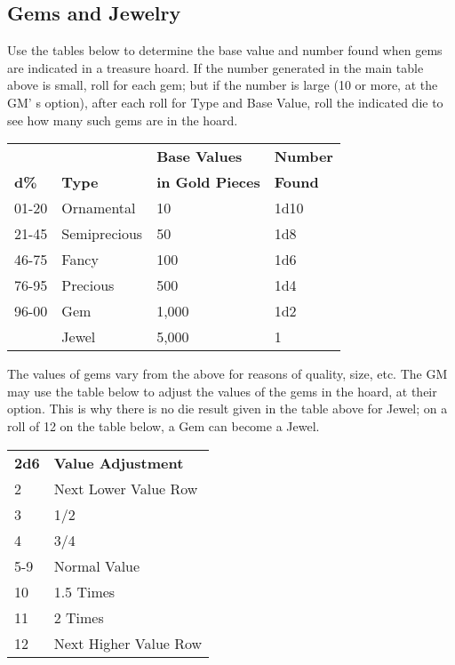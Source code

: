 \documentclass[a4paper,twoside,openany,10pt]{book}
\begin{document}
\begin{multicols}{2}
	
\subsection{Gems and Jewelry}\label{gems-and-jewelry}

Use the tables below to determine the base value and number found when gems are indicated in a treasure hoard. If the number generated in the main table above is small, roll for each gem; but if the number is large (10 or more, at the GM' s option), after each roll for Type and Base Value, roll the indicated die to see how many such gems are in the hoard.\medskip

\begin{tabular*}{0.93\linewidth}{@{\extracolsep{\fill}}llll}
&  & \textbf{Base Values} & \textbf{Number}\\
\textbf{d\%} & \textbf{Type} & \textbf{in Gold Pieces} & \textbf{Found}\\\toprule
01-20 & Ornamental & 10 & 1d10 \\\hline
21-45 & Semiprecious & 50 & 1d8 \\\hline
46-75 & Fancy & 100 & 1d6 \\\hline
76-95 & Precious & 500 & 1d4 \\\hline
96-00 & Gem & 1,000 & 1d2 \\\hline
& Jewel & 5,000 & 1 \\\bottomrule
\end{tabular*}\medskip

The values of gems vary from the above for reasons of quality, size, etc. The GM may use the table below to adjust the values of the gems in the hoard, at their option. This is why there is no die result given in the table above for Jewel; on a roll of 12 on the table below, a Gem can become a Jewel.\medskip

\begin{tabular*}{0.93\linewidth}{@{\extracolsep{\fill}}ll}
\textbf{2d6} & \textbf{Value Adjustment} \\
2 & Next Lower Value Row \\\toprule
3 & 1/2 \\\hline
4 & 3/4 \\\hline
5-9 & Normal Value \\\hline
10 & 1.5 Times \\\hline
11 & 2 Times \\\hline
12 & Next Higher Value Row \\\bottomrule
\end{tabular*}\medskip


\end{multicols}
\end{document}
